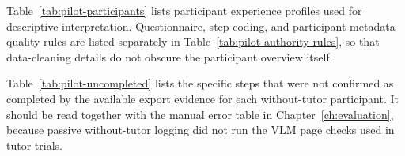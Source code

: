 Table~\ref{tab:pilot-participants} lists participant experience profiles used
for descriptive interpretation. Questionnaire, step-coding, and participant
metadata quality rules are listed separately in
Table~\ref{tab:pilot-authority-rules}, so that data-cleaning details do not
obscure the participant overview itself.

\begin{table}[htbp]
\centering
\caption{Pilot participant experience profiles (self-reported).}\label{tab:pilot-participants}
\small
{}
\end{table}

Table~\ref{tab:pilot-uncompleted} lists the specific steps that were not
confirmed as completed by the available export evidence for each without-tutor
participant. It should be read together with the manual error table in
Chapter~\ref{ch:evaluation}, because passive without-tutor logging did not run
the VLM page checks used in tutor trials.

